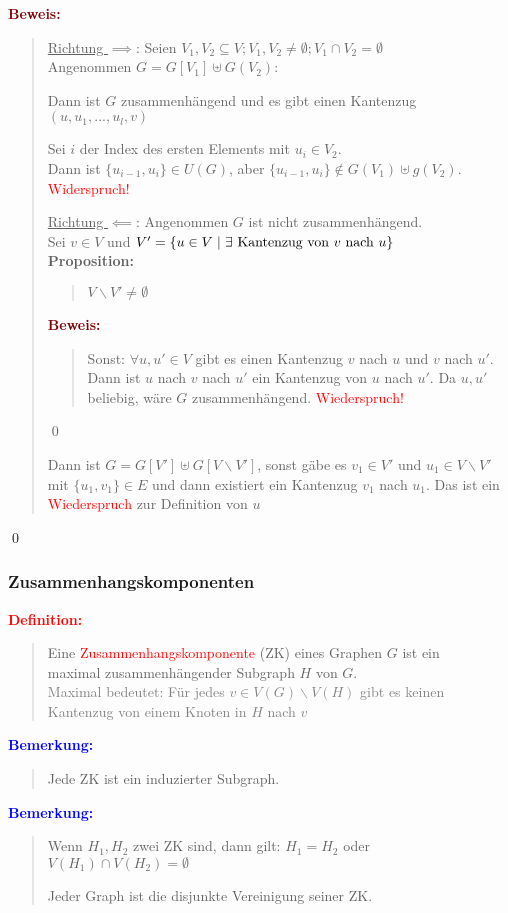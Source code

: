 \documentclass{article}
\newcommand{\smsp}{\phantom{\hspace{3px}}}
\newcommand{\red}[1]{\textcolor{red}{#1}}
\newcommand{\gray}[1]{\textcolor{gray}{#1}}
\newcommand{\blue}[1]{\textcolor{blue}{#1}}
\newcommand{\dgr}[1]{\textcolor{dgr}{#1}}
\newcommand{\maroon}[1]{\textcolor{maroon}{#1}}
\newcommand{\de}[1]{\red{\textbf{Definition: }}\begin{quote}#1\end{quote}}
\newcommand{\an}[1]{\blue{\textbf{Bemerkung: }}\begin{quote}#1\end{quote}}
\newcommand{\prop}[1]{\dgr{\textbf{Proposition: }}\begin{quote}#1\end{quote}}
\newcommand{\pr}[1]{\maroon{\textbf{Beweis: }}\begin{quote}#1\end{quote}\qed}
\renewcommand{\st}{\smsp | \smsp}
\newcommand{\bs}{\backslash}
\begin{document}
\pr{
    \underline{Richtung $\implies$}: Seien $V_1, V_2 \subseteq V; V_1,V_2 \ne \emptyset; V_1 \cap V_2 = \emptyset$\\
    Angenommen $G = G[V_1] \uplus G(V_2)$:

    Dann ist $G$ zusammenhängend und es gibt einen Kantenzug\\
    $(u,u_1,...,u_l,v)$

    Sei $i$ der Index des ersten Elements mit $u_i \in V_2$.\\
    Dann ist $\{u_{i-1},u_i\} \in U(G)$, aber $\{u_{i-1}, u_i\} \notin G(V_1) \uplus g(V_2)$.\\
    \red{Widerspruch!}

    \underline{Richtung $\impliedby$}: Angenommen $G$ ist nicht zusammenhängend.\\
    Sei $v \in V$ und $V' = \{u \in V \st \exists \text{ Kantenzug von $v$ nach $u$}\}$\\
    \prop{
        $V \bs V' \ne \emptyset$
    }
    \pr{
        Sonst: $\forall u, u' \in V$ gibt es einen Kantenzug $v$ nach $u$ und $v$ nach $u'$. Dann ist $u$ nach $v$ nach $u'$ ein Kantenzug von $u$ nach $u'$. Da $u, u'$ beliebig, wäre $G$ zusammenhängend. \red{Wiederspruch!}
    }

    Dann ist $G = G[V'] \uplus G[V \bs V']$, sonst gäbe es $v_1 \in V'$ und $u_1 \in V \bs V'$ mit $\{u_1,v_1\} \in E$ und dann existiert ein Kantenzug $v_1$ nach $u_1$. Das ist ein \red{Wiederspruch} zur Definition von $u$
}

\subsubsection{Zusammenhangskomponenten}

\de{
    Eine \red{Zusammenhangskomponente} (ZK) eines Graphen $G$ ist ein\\
    maximal zusammenhängender Subgraph $H$ von $G$.\\
    \gray{Maximal bedeutet: Für jedes $v \in V(G) \bs V(H)$ gibt es keinen\\
    Kantenzug von einem Knoten in $H$ nach $v$}
}

\newpage
\an{
    Jede ZK ist ein induzierter Subgraph.
}

\an{
    Wenn $H_1, H_2$ zwei ZK sind, dann gilt: $H_1 = H_2$ oder\\
    $V(H_1) \cap V(H_2) = \emptyset$

    Jeder Graph ist die disjunkte Vereinigung seiner ZK.
}
\end{document}
